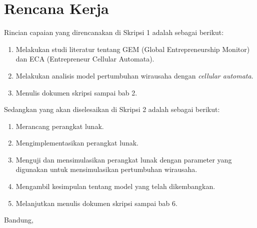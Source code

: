\documentclass[a4paper,twoside]{article}
\begin{document}
\section{Rencana Kerja}
Rincian capaian yang direncanakan di Skripsi 1 adalah sebagai berikut:
\begin{enumerate}
	\item Melakukan studi literatur tentang GEM (Global Entrepreneurship Monitor) dan ECA (Entrepreneur Cellular Automata).
	\item Melakukan analisis model pertumbuhan wirausaha dengan \textit{cellular automata}.
	\item Menulis dokumen skripsi sampai bab 2.
\end{enumerate}

Sedangkan yang akan diselesaikan di Skripsi 2 adalah sebagai berikut:
\begin{enumerate}
	\item Merancang perangkat lunak.
	\item Mengimplementasikan perangkat lunak.
	\item Menguji dan mensimulasikan perangkat lunak dengan parameter yang digunakan untuk mensimulasikan pertumbuhan wirausaha.
	\item Mengambil kesimpulan tentang model yang telah dikembangkan.
	\item Melanjutkan menulis dokumen skripsi sampai bab 6.
\end{enumerate}

\vspace{1cm}
\centering Bandung, \tanggal\\
\vspace{2cm} \nama \\ 
\vspace{1cm}
\end{document}
